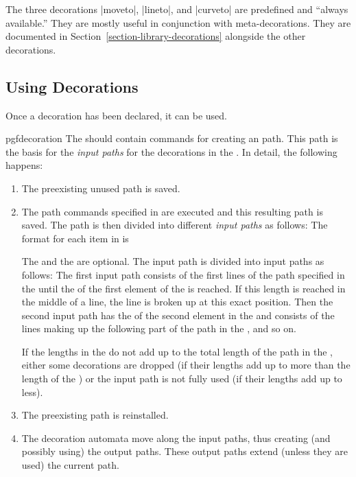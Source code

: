 The three decorations |moveto|, |lineto|, and |curveto| are predefined
and ``always available.'' They are mostly useful in conjunction with
meta-decorations. They are documented in
Section~\ref{section-library-decorations} alongside the other
decorations.



\subsection{Using Decorations}

Once a decoration has been declared, it can be used. 

\begin{environment}{{pgfdecoration}}
  The  should contain commands for creating
  an path. This path is the basis for the \emph{input paths}
  for the decorations in the . In detail, the
  following happens: 
  \begin{enumerate}
  \item
    The preexisting unused path is saved.
  \item 
    The path commands specified in  are
    executed and this resulting path is saved. The path is then
    divided into different \emph{input paths} as follows:
    The format for each item in  is 
    \begin{quote}
    \end{quote}
    The  and the  are optional. The
    input path is divided into input paths as follows: The first input
    path consists of the first lines of the path specified in the
     until the   of the first
    element of the  is reached. If this length
    is reached in the middle of a line, the line is broken up at this
    exact position. Then the second input path has the 
    of the second element in the  and consists
    of the lines making up the following  part of the
    path in the , and so on.

    If the lengths in the 
    do not add up to the total length of the path in the
    , either some  decorations are dropped
    (if their lengths add up to more than the length of the
    ) or
    the input path is not fully used (if their lengths  add up to less).
  \item
    The preexisting path is reinstalled.
  \item
    The decoration automata move along the input paths, thus creating
    (and  possibly using) the output paths. These output paths extend
    (unless they are used) the current path.
  \end{enumerate}
	 

\end{environment}
